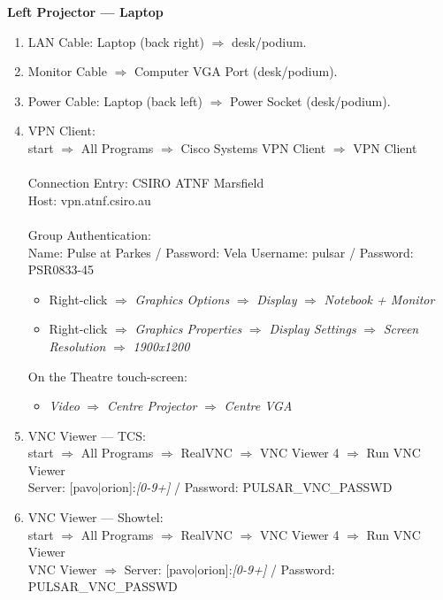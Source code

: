 \documentclass{article}
\begin{document}
\textbf{Left Projector --- Laptop}
\begin{enumerate}
\item LAN Cable: Laptop (back right) $\Rightarrow$ desk/podium.
\item Monitor Cable $\Rightarrow$ Computer VGA Port (desk/podium).
\item Power Cable: Laptop (back left) $\Rightarrow$ Power Socket (desk/podium).

\item VPN Client: \\
start $\Rightarrow$ All Programs $\Rightarrow$ Cisco Systems VPN Client $\Rightarrow$ VPN Client \\ \\
Connection Entry: CSIRO ATNF Marsfield \\
Host: vpn.atnf.csiro.au \\
\\
Group Authentication: \\
Name: Pulse at Parkes / Password: Vela
Username: pulsar / Password: PSR0833-45

\begin{itemize}
\item Right-click $\Rightarrow$ \emph{Graphics Options} $\Rightarrow$ \emph{Display} $\Rightarrow$ \emph{Notebook + Monitor}
\item Right-click $\Rightarrow$ \emph{Graphics Properties} $\Rightarrow$ \emph{Display Settings} $\Rightarrow$ \emph{Screen Resolution} $\Rightarrow$ \emph{1900x1200}
\end{itemize}

On the Theatre touch-screen:
\begin{itemize}
\item \emph{Video} $\Rightarrow$ \emph{Centre Projector} $\Rightarrow$ \emph{Centre VGA}
\end{itemize}

\item VNC Viewer --- TCS: \\
start $\Rightarrow$ All Programs $\Rightarrow$ RealVNC $\Rightarrow$ VNC Viewer 4 $\Rightarrow$ Run VNC Viewer \\
Server: [pavo$|$orion]:\emph{[0-9+]} / Password: PULSAR\_VNC\_PASSWD 

\item VNC Viewer --- Showtel: \\
start $\Rightarrow$ All Programs $\Rightarrow$ RealVNC $\Rightarrow$ VNC Viewer 4 $\Rightarrow$ Run VNC Viewer \\
VNC Viewer $\Rightarrow$ Server: [pavo$|$orion]:\emph{[0-9+]} / Password: PULSAR\_VNC\_PASSWD 
\end{enumerate}
\end{document}

